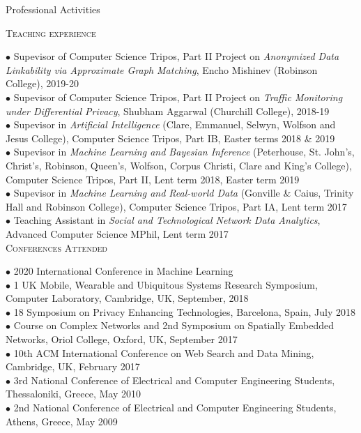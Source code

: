 \documentclass[12pt]{resume}
\begin{document}
\begin{category}{Professional Activities} 

\citemnobullet 
\textsc{Teaching experience}

{$\bullet$  Supevisor of Computer Science Tripos, Part II Project on \emph{Anonymized Data Linkability via Approximate Graph Matching}, Encho Mishinev (Robinson College), 2019-20}\\
{$\bullet$  Supevisor of Computer Science Tripos, Part II Project on \emph{Traffic Monitoring under Differential Privacy}, Shubham Aggarwal (Churchill College), 2018-19}\\
{$\bullet$  Supevisor in \emph{Artificial Intelligence} (Clare, Emmanuel, Selwyn, Wolfson and Jesus College), Computer Science Tripos, Part IB, Easter terms 2018 \& 2019}\\
{$\bullet$  Supevisor in \emph{Machine Learning and Bayesian Inference} (Peterhouse, St. John's, Christ's, Robinson, Queen's, Wolfson, Corpus Christi, Clare and King's College), Computer Science Tripos, Part II, Lent term 2018, Easter term 2019}\\
{$\bullet$  Supevisor in \emph{Machine Learning and Real-world Data} (Gonville \& Caius, Trinity Hall and Robinson College), Computer Science Tripos, Part IA, Lent term 2017}\\
{$\bullet$ Teaching Assistant in \emph{Social and Technological Network Data Analytics}, Advanced Computer Science MPhil, Lent term 2017}\\


\citemnobullet 
\textsc{Conferences Attended}

$\bullet$ 2020 International Conference in Machine Learning\\
$\bullet$ 1 UK Mobile, Wearable and Ubiquitous Systems Research Symposium, Computer Laboratory, Cambridge, UK, September, 2018\\
$\bullet$ 18 Symposium on Privacy Enhancing Technologies, Barcelona, Spain, July 2018\\
$\bullet$ Course on Complex Networks and 2nd Symposium on Spatially Embedded Networks,  Oriol College, Oxford, UK, September 2017\\
$\bullet$ 10th ACM International Conference on Web Search and Data Mining, Cambridge, UK, February 2017\\
$\bullet$ 3rd National Conference of Electrical and Computer Engineering Students, Thessaloniki, Greece, May 2010\\
$\bullet$ 2nd National Conference of Electrical and Computer Engineering Students, Athens, Greece, May 2009 \\


\end{category}
\end{document}
